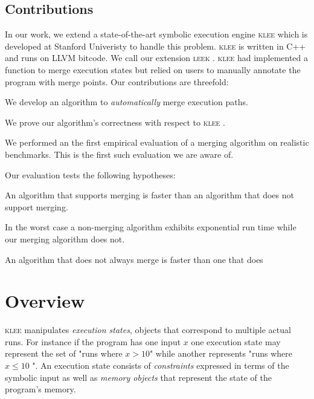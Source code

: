 \documentclass[12pt,a4paper]{article}
\newcommand{\klee}{\textsc{klee }}
\newcommand{\leek}{\textsc{leek }}
\begin{document}
\subsection{Contributions}

In our work, we extend a state-of-the-art symbolic execution engine \klee \cite{klee} which is developed at Stanford Univeristy to handle this problem. \klee is written in C++ and runs on LLVM bitcode. We call our extension \leek. \klee had implemented a function to merge execution states but relied on users to manually annotate the program with merge points. Our contributions are threefold:

\linespread{0}
\begin{enumerate*}

\item We develop an algorithm to \emph{automatically} merge execution paths.
\item We prove our algorithm's correctness with respect to \klee.
\item We performed an the first empirical evaluation of a merging algorithm on realistic benchmarks. This is the first such evaluation we are aware of.

\end{enumerate*}

Our evaluation tests the following hypotheses:

\begin{enumerate*}
\item An algorithm that supports merging is faster than an algorithm that does not support merging.
\item In the worst case a non-merging algorithm exhibits exponential run time while our merging algorithm does not.
\item An algorithm that does not always merge is faster than one that does

\end{enumerate*}

\section{Overview}\label{overview}

\klee manipulates \emph{execution states}, objects that correspond to multiple actual runs. For instance if the program has one input $x$ one execution state may represent the set of "runs where $x > 10$" while another represents "runs where $x \le 10$ ". An execution state consists of \emph{constraints} expressed in terms of the symbolic input as well as \emph{memory objects} that represent the state of the program's memory.
\end{document}
